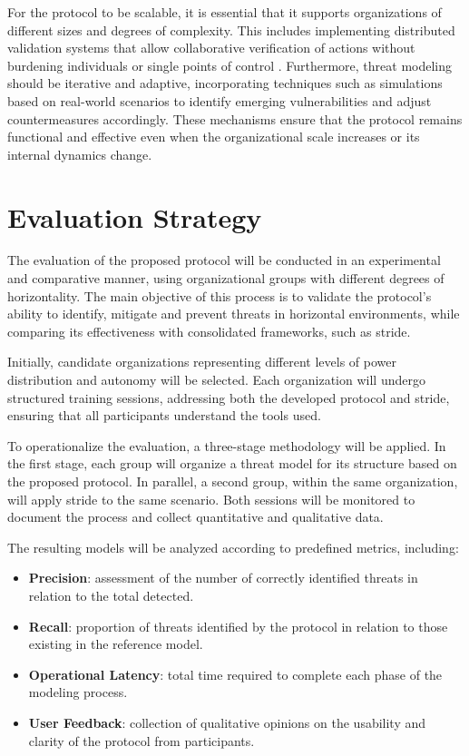 For the protocol to be scalable, it is essential that it supports organizations
of different sizes and degrees of complexity. This includes implementing
distributed validation systems that allow collaborative verification of actions
without burdening individuals or single points of control \cite{Colbac}.
Furthermore, threat modeling should be iterative and adaptive, incorporating
techniques such as simulations based on real-world scenarios to identify
emerging vulnerabilities and adjust countermeasures accordingly. These
mechanisms ensure that the protocol remains functional and effective even when
the organizational scale increases or its internal dynamics change.

\section{Evaluation Strategy}
\label{sec:evaluation_strategy}

The evaluation of the proposed protocol will be conducted in an experimental and
comparative manner, using organizational groups with different degrees of
horizontality. The main objective of this process is to validate the protocol's
ability to identify, mitigate and prevent threats in horizontal environments,
while comparing its effectiveness with consolidated frameworks, such as
\gls{stride}.

Initially, candidate organizations representing different levels of power
distribution and autonomy will be selected. Each organization will undergo
structured training sessions, addressing both the developed protocol and
\gls{stride}, ensuring that all participants understand the tools used.

To operationalize the evaluation, a three-stage methodology will be applied. In
the first stage, each group will organize a threat model for its structure based
on the proposed protocol. In parallel, a second group, within the same
organization, will apply \gls{stride} to the same scenario. Both sessions will
be monitored to document the process and collect quantitative and qualitative
data.

The resulting models will be analyzed according to predefined metrics,
including:

\begin{itemize}
    \item \textbf{Precision}: assessment of the number of correctly identified threats
in relation to the total detected.
    \item \textbf{Recall}: proportion of threats identified by the protocol in relation
to those existing in the reference model.
    \item \textbf{Operational Latency}: total time required to complete each phase
of the modeling process.
    \item \textbf{User Feedback}: collection of qualitative opinions on
the usability and clarity of the protocol from participants.
\end{itemize}

